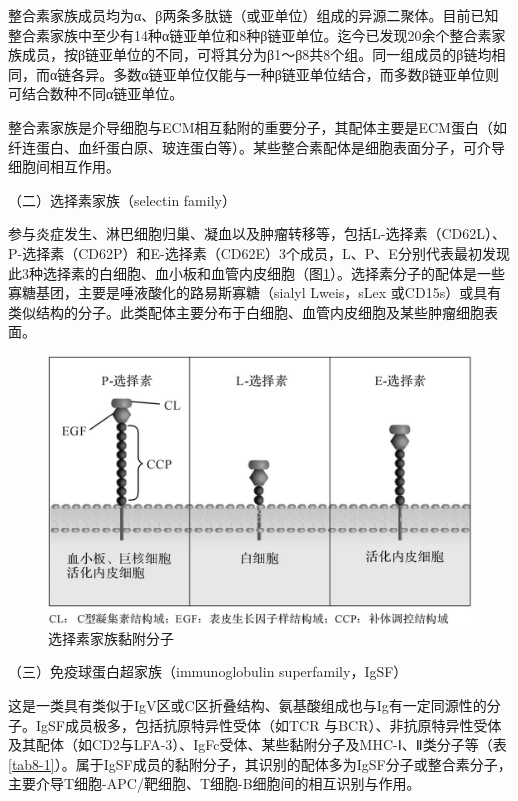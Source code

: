整合素家族成员均为α、β两条多肽链（或亚单位）组成的异源二聚体。目前已知整合素家族中至少有14种α链亚单位和8种β链亚单位。迄今已发现20余个整合素家族成员，按β链亚单位的不同，可将其分为β1～β8共8个组。同一组成员的β链均相同，而α链各异。多数α链亚单位仅能与一种β链亚单位结合，而多数β链亚单位则可结合数种不同α链亚单位。

整合素家族是介导细胞与ECM相互黏附的重要分子，其配体主要是ECM蛋白（如纤连蛋白、血纤蛋白原、玻连蛋白等）。某些整合素配体是细胞表面分子，可介导细胞间相互作用。

（二）选择素家族（selectin family）

参与炎症发生、淋巴细胞归巢、凝血以及肿瘤转移等，包括L-选择素（CD62L）、P-选择素（CD62P）和E-选择素（CD62E）3个成员，L、P、E分别代表最初发现此3种选择素的白细胞、血小板和血管内皮细胞（图\ref{fig8-8}）。选择素分子的配体是一些寡糖基团，主要是唾液酸化的路易斯寡糖（sialyl
Lweis，sLex
或CD15s）或具有类似结构的分子。此类配体主要分布于白细胞、血管内皮细胞及某些肿瘤细胞表面。

\begin{figure}[!htbp]
 \centering
 \includegraphics{./images/Image00118.jpg}
 \captionsetup{justification=centering}
 \caption{选择素家族黏附分子}
 \label{fig8-8}
  \end{figure} 

（三）免疫球蛋白超家族（immunoglobulin superfamily，IgSF）

这是一类具有类似于IgV区或C区折叠结构、氨基酸组成也与Ig有一定同源性的分子。IgSF成员极多，包括抗原特异性受体（如TCR
与BCR）、非抗原特异性受体及其配体（如CD2与LFA-3）、IgFc受体、某些黏附分子及MHC-Ⅰ、Ⅱ类分子等（表\ref{tab8-1}）。属于IgSF成员的黏附分子，其识别的配体多为IgSF分子或整合素分子，主要介导T细胞-APC/靶细胞、T细胞-B细胞间的相互识别与作用。

